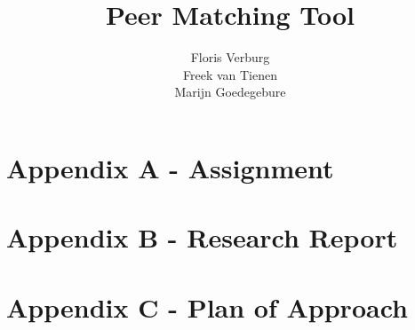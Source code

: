 \documentclass{tudelft-report}
\begin{document}
\frontmatter
\newcommand{\reqr}[1]{{\noindent\emph{#1:}}}

\title[TI3800 Bachelorproject]{Peer Matching Tool}
\author{Floris Verburg\\Freek van Tienen\\Marijn Goedegebure}
\makecover







\tableofcontents

\mainmatter













\appendix

%
\chapter{Appendix A - Assignment}


\chapter{Appendix B - Research Report}


\chapter{Appendix C - Plan of Approach}

%
%



\end{document}
